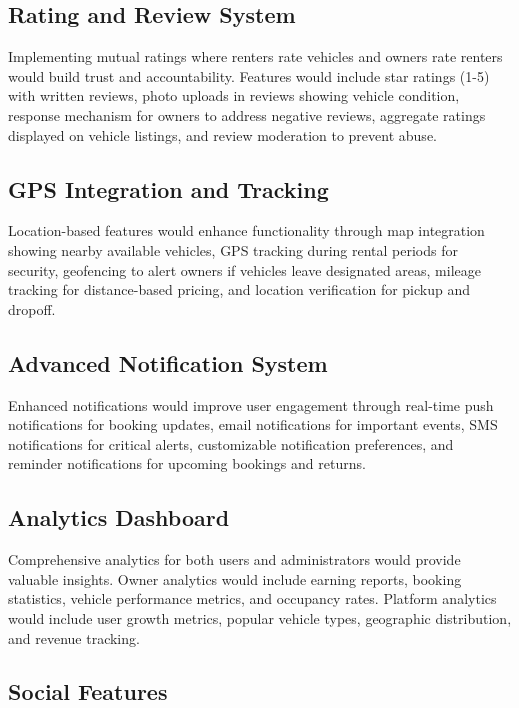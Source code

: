 \documentclass[12pt,a4paper]{report}
\begin{document}
	\subsection{Rating and Review System}
	
	Implementing mutual ratings where renters rate vehicles and owners rate renters would build trust and accountability. Features would include star ratings (1-5) with written reviews, photo uploads in reviews showing vehicle condition, response mechanism for owners to address negative reviews, aggregate ratings displayed on vehicle listings, and review moderation to prevent abuse.
	
	\subsection{GPS Integration and Tracking}
	
	Location-based features would enhance functionality through map integration showing nearby available vehicles, GPS tracking during rental periods for security, geofencing to alert owners if vehicles leave designated areas, mileage tracking for distance-based pricing, and location verification for pickup and dropoff.
	
	\subsection{Advanced Notification System}
	
	Enhanced notifications would improve user engagement through real-time push notifications for booking updates, email notifications for important events, SMS notifications for critical alerts, customizable notification preferences, and reminder notifications for upcoming bookings and returns.
	
	\subsection{Analytics Dashboard}
	
	Comprehensive analytics for both users and administrators would provide valuable insights. Owner analytics would include earning reports, booking statistics, vehicle performance metrics, and occupancy rates. Platform analytics would include user growth metrics, popular vehicle types, geographic distribution, and revenue tracking.
	
	\subsection{Social Features}
	
\end{document}
